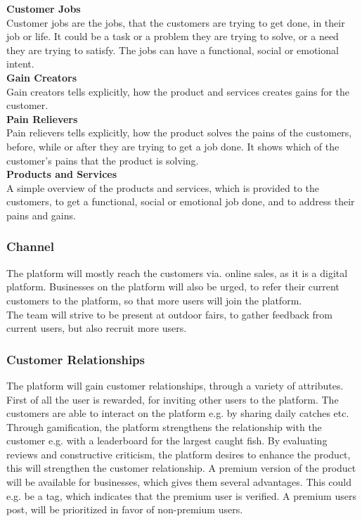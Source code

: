 {\noindent \textbf{Customer Jobs\\}}
Customer jobs are the jobs, that the customers are trying to get done, in their job or life. It could be a task or a problem they are trying to solve, or a need they are trying to satisfy. The jobs can have a functional, social or emotional intent. \\

{\noindent \textbf{Gain Creators\\}}
Gain creators tells explicitly, how the product and services creates gains for the customer.\\

{\noindent \textbf{Pain Relievers\\}}
Pain relievers tells explicitly, how the product solves the pains of the customers, before, while or after they are trying to get a job done. It shows which of the customer's pains that the product is solving. \\

{\noindent \textbf{Products and Services\\}}
A simple overview of the products and services, which is provided to the customers, to get a functional, social or emotional job done, and to address their pains and gains. 

\subsubsection{Channel}
The platform will mostly reach the customers via. online sales, as it is a digital platform. Businesses on the platform will also be urged, to refer their current customers to the platform, so that more users will join the platform.\\

The team will strive to be present at outdoor fairs, to gather feedback from current users, but also recruit more users.

\subsubsection{Customer Relationships}
The platform will gain customer relationships, through a variety of attributes. First of all the user is rewarded, for inviting other users to the platform. The customers are able to interact on the platform e.g. by sharing daily catches etc. Through gamification, the platform strengthens the relationship with the customer e.g. with a leaderboard for the largest caught fish. By evaluating reviews and constructive criticism, the platform desires to enhance the product, this will strengthen the customer relationship. A premium version of the product will be available for businesses, which gives them several advantages. This could e.g. be a tag, which indicates that the premium user is verified. A premium users post, will be prioritized in favor of non-premium users.

